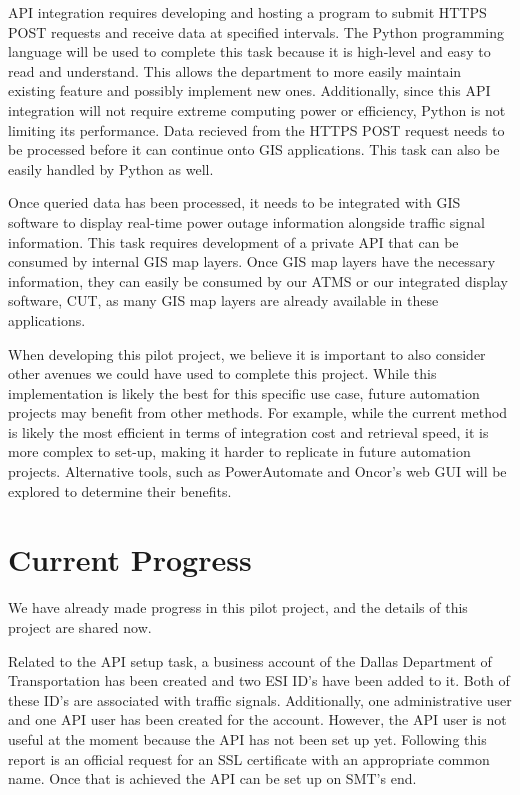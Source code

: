 \documentclass[letterpaper, notitlepage]{report}
\begin{document}
API integration requires developing and hosting a program to submit HTTPS POST requests and receive data at specified intervals. The Python programming language will be used to complete this task because it is high-level and easy to read and understand. This allows the department to more easily maintain existing feature and possibly implement new ones. Additionally, since this API integration will not require extreme computing power or efficiency, Python is not limiting its performance. Data recieved from the HTTPS POST request needs to be processed before it can continue onto GIS applications. This task can also be easily handled by Python as well.

Once queried data has been processed, it needs to be integrated with GIS software to display real-time power outage information alongside traffic signal information. This task requires development of a private API that can be consumed by internal GIS map layers. Once GIS map layers have the necessary information, they can easily be consumed by our ATMS or our integrated display software, CUT, as many GIS map layers are already available in these applications.

When developing this pilot project, we believe it is important to also consider other avenues we could have used to complete this project. While this implementation is likely the best for this specific use case, future automation projects may benefit from other methods. For example, while the current method is likely the most efficient in terms of integration cost and retrieval speed, it is more complex to set-up, making it harder to replicate in future automation projects. Alternative tools, such as PowerAutomate and Oncor's web GUI will be explored to determine their benefits.


\section{Current Progress}
We have already made progress in this pilot project, and the details of this project are shared now.

Related to the API setup task, a business account of the Dallas Department of Transportation has been created and two ESI ID's have been added to it. Both of these ID's are associated with traffic signals. Additionally, one administrative user and one API user has been created for the account. However, the API user is not useful at the moment because the API has not been set up yet. Following this report is an official request for an SSL certificate with an appropriate common name. Once that is achieved the API can be set up on SMT's end. 
\end{document}
